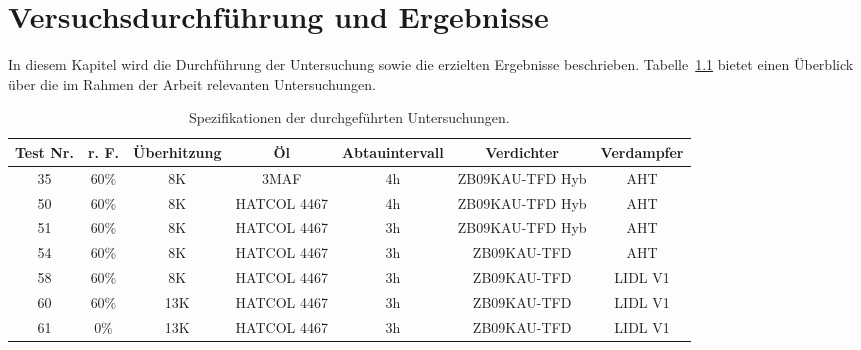 
\chapter{Versuchsdurchführung und Ergebnisse}
\label{cha:Versuchsdurchführung}

In diesem Kapitel wird die Durchführung der Untersuchung sowie die erzielten Ergebnisse beschrieben. Tabelle~\ref{tab:alltests} bietet einen Überblick über die im Rahmen der Arbeit relevanten Untersuchungen.

\begin{table}[h!]
\centering
\caption{Spezifikationen der durchgeführten Untersuchungen.}
\label{tab:alltests}
\begin{tabular}{|ccccccc|}
\hline
Test Nr.              & r. F.                     & Überhitzung              & Öl                               & Abtauintervall          & Verdichter                           & Verdampfer \\ \hline
\multicolumn{1}{|c|}{35} & \multicolumn{1}{c|}{60\%} & \multicolumn{1}{c|}{8K}  & \multicolumn{1}{c|}{3MAF}        & \multicolumn{1}{c|}{4h} & \multicolumn{1}{c|}{ZB09KAU-TFD Hyb} & AHT        \\
\multicolumn{1}{|c|}{50} & \multicolumn{1}{c|}{60\%} & \multicolumn{1}{c|}{8K}  & \multicolumn{1}{c|}{HATCOL 4467} & \multicolumn{1}{c|}{4h} & \multicolumn{1}{c|}{ZB09KAU-TFD Hyb} & AHT        \\
\multicolumn{1}{|c|}{51} & \multicolumn{1}{c|}{60\%} & \multicolumn{1}{c|}{8K}  & \multicolumn{1}{c|}{HATCOL 4467} & \multicolumn{1}{c|}{3h} & \multicolumn{1}{c|}{ZB09KAU-TFD Hyb} & AHT        \\
\multicolumn{1}{|c|}{54} & \multicolumn{1}{c|}{60\%} & \multicolumn{1}{c|}{8K}  & \multicolumn{1}{c|}{HATCOL 4467} & \multicolumn{1}{c|}{3h} & \multicolumn{1}{c|}{ZB09KAU-TFD}     & AHT        \\
\multicolumn{1}{|c|}{58} & \multicolumn{1}{c|}{60\%} & \multicolumn{1}{c|}{8K}  & \multicolumn{1}{c|}{HATCOL 4467} & \multicolumn{1}{c|}{3h} & \multicolumn{1}{c|}{ZB09KAU-TFD}     & LIDL V1    \\
\multicolumn{1}{|c|}{60} & \multicolumn{1}{c|}{60\%} & \multicolumn{1}{c|}{13K} & \multicolumn{1}{c|}{HATCOL 4467} & \multicolumn{1}{c|}{3h} & \multicolumn{1}{c|}{ZB09KAU-TFD}     & LIDL V1    \\
\multicolumn{1}{|c|}{61} & \multicolumn{1}{c|}{0\%}  & \multicolumn{1}{c|}{13K} & \multicolumn{1}{c|}{HATCOL 4467} & \multicolumn{1}{c|}{3h} & \multicolumn{1}{c|}{ZB09KAU-TFD}     & LIDL V1    \\

\end{tabular}
\end{table}
